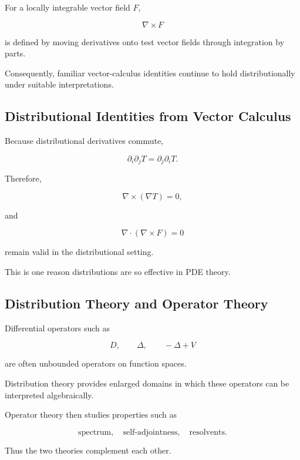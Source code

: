 For a locally integrable vector field \(F\),

\[
\boxed{
\nabla\times F
}
\]

is defined by moving derivatives onto test vector fields through
integration by parts.

Consequently, familiar vector-calculus identities continue to hold
distributionally under suitable interpretations.

\subsection{Distributional Identities from Vector Calculus}
\label{subsec:distribution-vector-identities}

Because distributional derivatives commute,

\[
\boxed{
\partial_i\partial_jT
=
\partial_j\partial_iT.
}
\]

Therefore,

\[
\boxed{
\nabla\times(\nabla T)=0,
}
\]

and

\[
\boxed{
\nabla\cdot(\nabla\times F)=0
}
\]

remain valid in the distributional setting.

This is one reason distributions are so effective in PDE theory.

\subsection{Distribution Theory and Operator Theory}
\label{subsec:distribution-operator-theory}

Differential operators such as

\[
D,
\qquad
\Delta,
\qquad
-\Delta+V
\]

are often unbounded operators on function spaces.

Distribution theory provides enlarged domains in which these operators
can be interpreted algebraically.

Operator theory then studies properties such as

\[
\boxed{
\text{spectrum},
\quad
\text{self-adjointness},
\quad
\text{resolvents}.
}
\]

Thus the two theories complement each other.

